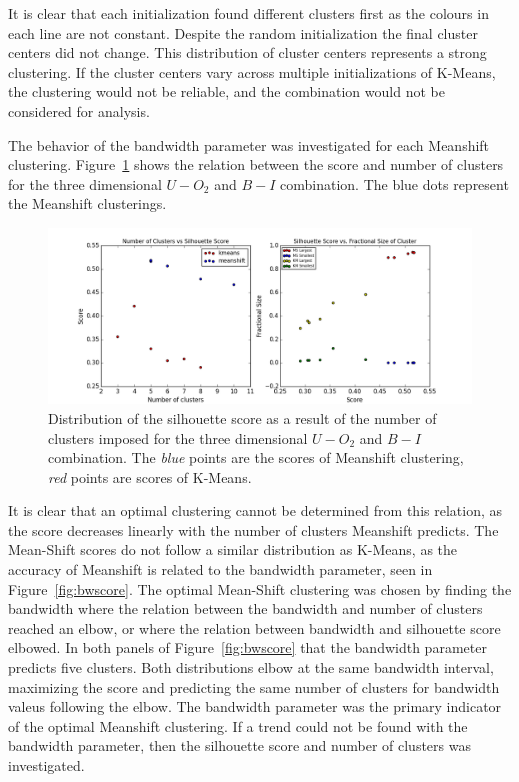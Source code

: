 It is clear that each initialization found different clusters first as the colours in each line are not constant. 
Despite the random initialization the final cluster centers did not change.
This distribution of cluster centers represents a strong clustering. 
If the cluster centers vary across multiple initializations of K-Means, the clustering would not be reliable, and the combination would not be considered for analysis.

The behavior of the bandwidth parameter was investigated for each Meanshift clustering.
Figure~\ref{fig:bad_ms} shows the relation between the score and number of clusters for the three dimensional $U - O_{2}$ and $B - I$ combination.
The blue dots represent the Meanshift clusterings.

\begin{figure}[H]
\centering
\includegraphics[width=\linewidth]{figs/methods/silhouette_score_bad_ms}
\caption{Distribution of the silhouette score as a result of the number of clusters imposed for the three dimensional $U - O_{2}$ and $B - I$ combination. The \textit{blue} points are the scores of Meanshift clustering, \textit{red} points are scores of K-Means.}
\label{fig:bad_ms}
\end{figure}

It is clear that an optimal clustering cannot be determined from this relation, as the score decreases linearly with the number of clusters Meanshift predicts.
The Mean-Shift scores do not follow a similar distribution as K-Means, as the accuracy of Meanshift is related to the bandwidth parameter, seen in Figure~\ref{fig:bwscore}.
The optimal Mean-Shift clustering was chosen by finding the bandwidth where the relation between the bandwidth and number of clusters reached an elbow, or where the relation between bandwidth and silhouette score elbowed.
In both panels of Figure~\ref{fig:bwscore} that the bandwidth parameter predicts five clusters.
Both distributions elbow at the same bandwidth interval, maximizing the score and predicting the same number of clusters for bandwidth valeus following the elbow.
The bandwidth parameter was the primary indicator of the optimal Meanshift clustering.
If a trend could not be found with the bandwidth parameter, then the silhouette score and number of clusters was investigated.

